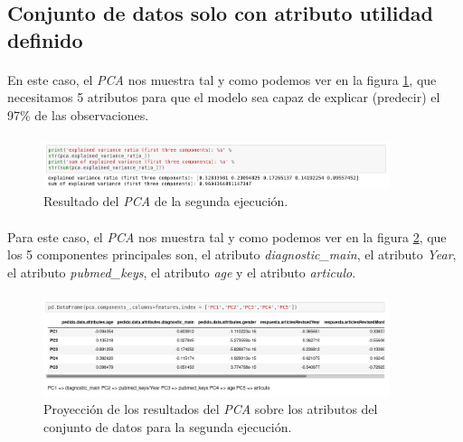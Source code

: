 \subsection{Conjunto de datos solo con atributo utilidad definido}

\paragraph{}
En este caso, el \textit{PCA} nos muestra tal y como podemos ver en la figura \ref{pcaTwoResult}, que necesitamos 5 atributos para que el modelo sea capaz de explicar (predecir) el 97\% de las observaciones.

\paragraph{}
\begin{figure}[!htb]
  \centering
    \includegraphics[width=0.9\textwidth]{images/resultados_procesado_de_datos_pca2_result.png}
    \caption{Resultado del \textit{PCA} de la segunda ejecución.}
  \label{pcaTwoResult}
\end{figure}

\paragraph{}
Para este caso, el \textit{PCA} nos muestra tal y como podemos ver en la figura \ref{pcaTwoAtributos}, que los 5 componentes principales son, el atributo \textit{diagnostic\_main}, el atributo \textit{Year}, el atributo \textit{pubmed\_keys}, el atributo \textit{age} y el atributo \textit{articulo}.

\paragraph{}
\begin{figure}[!htb]
  \centering
    \includegraphics[width=0.9\textwidth]{images/resultados_procesado_de_datos_pca2_atributos.png}
    \caption{Proyección de los resultados del \textit{PCA} sobre los atributos del conjunto de datos para la segunda ejecución.}
  \label{pcaTwoAtributos}
\end{figure}

